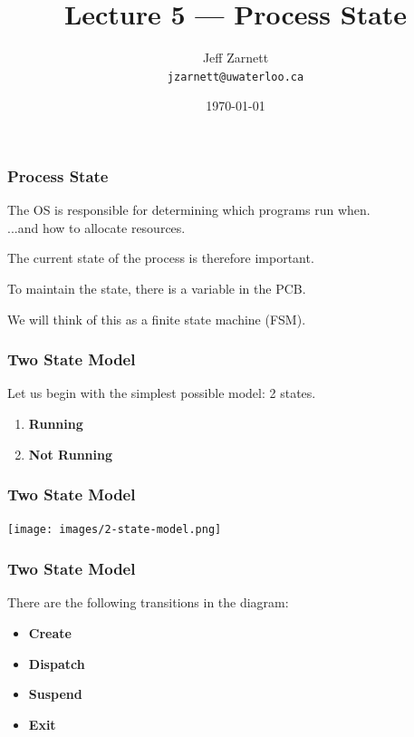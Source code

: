 

\title{Lecture 5 --- Process State}

\author{Jeff Zarnett \\ \small \texttt{jzarnett@uwaterloo.ca}}
\date{\today}




\begin{frame}
  \titlepage

 \end{frame}

\begin{frame}
\frametitle{Process State}

The OS is responsible for determining which programs run when.\\
\quad ...and how to allocate resources.

The current state of the process is therefore important.

To maintain the state, there is a variable in the PCB.

We will think of this as a finite state machine (FSM).

\end{frame}

\begin{frame}
\frametitle{Two State Model}
Let us begin with the simplest possible model: 2 states.

\begin{enumerate}
	\item \textbf{Running}
	\item \textbf{Not Running}
\end{enumerate}


\end{frame}

\begin{frame}
\frametitle{Two State Model}

\begin{center}
\texttt{[image: images/2-state-model.png]}
\end{center}

\end{frame}

\begin{frame}
\frametitle{Two State Model}

There are the following transitions in the diagram:
\begin{itemize}
	\item \textbf{Create}
	\item \textbf{Dispatch}
	\item \textbf{Suspend}
	\item \textbf{Exit}
\end{itemize}

\end{frame}

